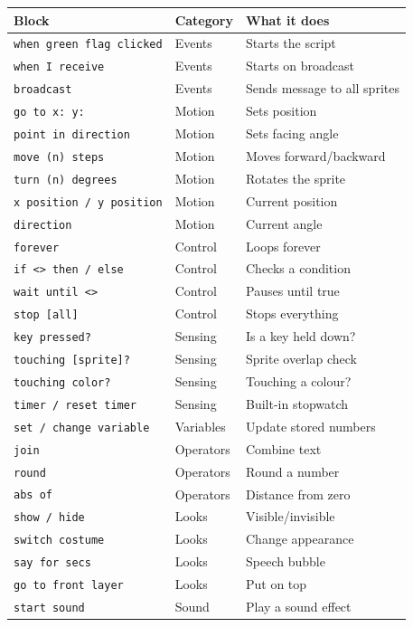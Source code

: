 \documentclass[11pt,a4paper]{article}
\begin{document}
\renewcommand{\arraystretch}{1.3}
\begin{tabularx}{\textwidth}{l l X}
\toprule
\textbf{Block} & \textbf{Category} & \textbf{What it does} \\
\midrule
\texttt{when green flag clicked} & Events & Starts the script \\
\texttt{when I receive} & Events & Starts on broadcast \\
\texttt{broadcast} & Events & Sends message to all sprites \\
\midrule
\texttt{go to x: y:} & Motion & Sets position \\
\texttt{point in direction} & Motion & Sets facing angle \\
\texttt{move (n) steps} & Motion & Moves forward/backward \\
\texttt{turn (n) degrees} & Motion & Rotates the sprite \\
\texttt{x position / y position} & Motion & Current position \\
\texttt{direction} & Motion & Current angle \\
\midrule
\texttt{forever} & Control & Loops forever \\
\texttt{if <> then / else} & Control & Checks a condition \\
\texttt{wait until <>} & Control & Pauses until true \\
\texttt{stop [all]} & Control & Stops everything \\
\midrule
\texttt{key pressed?} & Sensing & Is a key held down? \\
\texttt{touching [sprite]?} & Sensing & Sprite overlap check \\
\texttt{touching color?} & Sensing & Touching a colour? \\
\texttt{timer / reset timer} & Sensing & Built-in stopwatch \\
\midrule
\texttt{set / change variable} & Variables & Update stored numbers \\
\midrule
\texttt{join} & Operators & Combine text \\
\texttt{round} & Operators & Round a number \\
\texttt{abs of} & Operators & Distance from zero \\
\midrule
\texttt{show / hide} & Looks & Visible/invisible \\
\texttt{switch costume} & Looks & Change appearance \\
\texttt{say for secs} & Looks & Speech bubble \\
\texttt{go to front layer} & Looks & Put on top \\
\midrule
\texttt{start sound} & Sound & Play a sound effect \\
\bottomrule
\end{tabularx}
\end{document}
